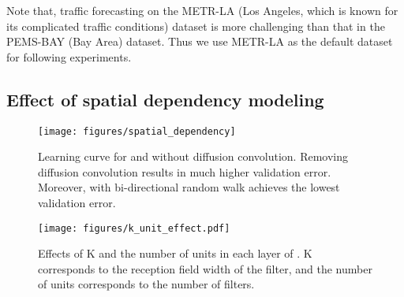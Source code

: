 Note that, traffic forecasting on the METR-LA (Los Angeles, which is known for its complicated traffic conditions) dataset is more challenging than that in the PEMS-BAY (Bay Area) dataset.
Thus we use METR-LA as the default dataset for following experiments.


\vspace{-0.1in}
\subsection{Effect of spatial dependency modeling}
\vspace{-0.1in}
\begin{figure*}[tp]
    \centering
	\begin{minipage}{.48\textwidth}
	\centering
\texttt{[image: figures/spatial\_dependency]}
	\caption{Learning curve for \gcrnn{} and \gcrnn{} without diffusion convolution. Removing diffusion convolution results in much higher validation error. Moreover, \gcrnn{} with bi-directional random walk achieves the lowest validation error.}
	\label{fig:spatial_dependency}
	\end{minipage}
\hspace{0.01\textwidth}
	\begin{minipage}{.48\textwidth}
	\centering
    \texttt{[image: figures/k\_unit\_effect.pdf]}
	\caption{Effects of K and the number of units in each layer of \gcrnn{}. K corresponds to the reception field width of the filter, and the number of units corresponds to the number of filters.}
	\label{fig:k_effect}
	\end{minipage} 
\end{figure*}


\begin{table}[tp]
\centering
\caption{Performance comparison for \gcrnn{} and GCRNN on the METRA-LA dataset.}
\label{tab:dcrnn_vs_gcrnn}
\end{table}

